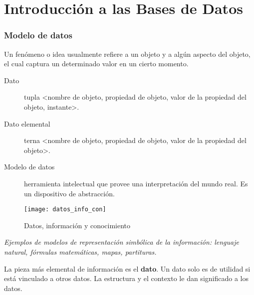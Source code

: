 \documentclass[a4paper, twoside]{article}
\newcommand{\rutapaquetes}{./paquetes-apunte}
\begin{document}
\maketitle

\tableofcontents


\part{Introducción a las Bases de Datos}

\section{Modelo de datos}
Un fenómeno o idea usualmente refiere a un objeto y a algún aspecto del objeto, el cual captura un determinado valor en un cierto momento.

\begin{description}
	\item[Dato] tupla \textless nombre de objeto, propiedad de objeto, valor de la propiedad del objeto, instante\textgreater .
	\item[Dato elemental] terna \textless nombre de objeto, propiedad de objeto, valor de la propiedad del objeto\textgreater .
	\item[Modelo de datos] herramienta intelectual que provee una interpretación del mundo real. Es un dispositivo de abstracción.
\end{description}

\begin{figure}[H]
	\centering
	\texttt{[image: datos\_info\_con]}
	\caption{Datos, información y conocimiento}
\end{figure}

\emph{Ejemplos de modelos de representación simbólica de la información: lenguaje natural, fórmulas matemáticas, mapas, partituras.}

La pieza más elemental de información es el \textbf{dato}. Un dato solo es de utilidad si está vinculado a otros datos. La estructura y el contexto le dan significado a los datos.
\end{document}
